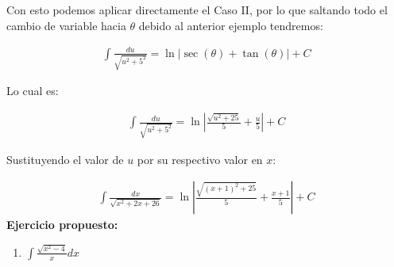 Con esto podemos aplicar directamente el Caso II, por lo que saltando todo el cambio de variable hacia \(\displaystyle\theta\) debido al anterior ejemplo tendremos:

\begin{equation*}
    \begin{gathered}
        \int \frac{du}{\sqrt{u^{2}+5^{2}}}=\ln\left|\sec(\theta)+\tan(\theta)\right|+C
    \end{gathered}
\end{equation*}

Lo cual es:

\begin{equation*}
    \begin{gathered}
        \int \frac{du}{\sqrt{u^{2}+5^{2}}}=\ln\left|\frac{\sqrt{u^{2}+25}}{5}+\frac{u}{5}\right|+C
    \end{gathered}
\end{equation*}

Sustituyendo el valor de \(\displaystyle u\) por su respectivo valor en \(\displaystyle x\):

\begin{equation*}
    \begin{gathered}
        \int\frac{dx}{\sqrt{x^{2}+2x+26}}=\ln\left|\frac{{\sqrt{(x+1)^2+25}}}{5}+\frac{x+1}{5}\right|+C
    \end{gathered}
\end{equation*}
\textbf{Ejercicio propuesto:}
\begin{enumerate}
  \item \(\displaystyle\int\frac{\sqrt{x^{2}-4}}{x}dx\)
\end{enumerate}
\clearpage